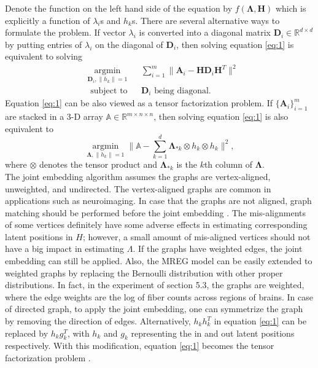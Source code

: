 \documentclass[10pt,journal,compsoc]{IEEEtran}
\newcommand{\bA}{\mathbf{A}}
\newcommand{\bH}{\mathbf{H}}
\newcommand{\bD}{\mathbf{D}}
\newcommand{\bLambda}{\mathbf{\Lambda}}
\begin{document}
 Denote the function on the left hand side of the equation by $f(\bLambda,\bH)$ which is explicitly a function of $\lambda_i$s and $h_k$s. There are several alternative ways to formulate the problem. If vector $\lambda_i$ is converted into a diagonal matrix $\bD_i \in \mathbb{R}^{d \times d}$ by putting entries of $\lambda_i$ on the diagonal of $\bD_i$, then solving equation \eqref{eq:1} is equivalent to solving
 \begin{equation*}
\begin{aligned}  
	& \underset{\bD_i,\|h_k\|=1}{\operatorname{argmin}} 
	& & \sum\limits_{i=1}^{m} \| \bA_i- \bH \bD_i \bH^T \|  ^2 \\
	& \text{ subject to} 
	& &  \bD_i \text{ being diagonal.}
\end{aligned}
\end{equation*}
Equation \eqref{eq:1} can be also viewed as a tensor factorization problem. If $\{\bA_i\}_{i=1}^m$ are stacked in a 3-D array ${\mathbb A} \in \mathbb{R}^{m\times n \times n}$, then solving equation \eqref{eq:1} is also equivalent to
\[  \underset{\bLambda,\|h_k\|=1}{\operatorname{argmin}}  \| {\mathbb A} - \sum\limits_{k=1}^{d} \bLambda_{*k} \otimes h_k \otimes h_k\|  ^2,  \]
where $\otimes$ denotes the tensor product and $\bLambda_{*k}$ is the $k$th column of $\bLambda$. \\

\noindent The joint embedding algorithm assumes the graphs are vertex-aligned, unweighted, and undirected. The vertex-aligned graphs are common in applications such as neuroimaging. In case that the graphs are not aligned, graph matching should be performed before the joint embedding \cite{yan2014graduated,park2016encouraging}. The mis-alignments of some vertices definitely have some adverse effects in estimating corresponding latent positions in $H$; however, a small amount of mis-aligned vertices should not have a big impact in estimating $\Lambda$. If the graphs have weighted edges, the joint embedding can still be applied. Also, the MREG model can be easily extended to weighted graphs by replacing the Bernoulli distribution with other proper distributions. In fact, in the experiment of section 5.3, the graphs are weighted, where the edge weights are the log of fiber counts across regions of brains. In case of directed graph, to apply the joint embedding, one can symmetrize the graph by removing the direction of edges. Alternatively, $h_k h_k^T$ in equation \eqref{eq:1} can be replaced by $h_k g_k^T$, with  $h_k$ and $g_k$ representing the in and out latent positions respectively. With this modification, equation \eqref{eq:1} becomes the tensor factorization problem \cite{kolda2009tensor}.\\
\end{document}
